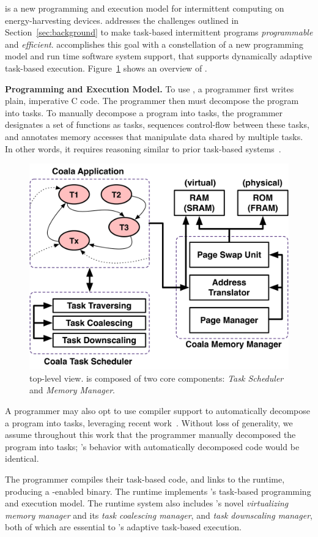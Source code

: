 \sys is a new programming and execution model for intermittent computing on energy-harvesting devices. \sys addresses the challenges outlined in Section~\ref{sec:background} to make task-based intermittent programs {\em programmable} and {\em efficient}. \sys accomplishes this goal with a constellation of a new programming model and run time software system support, that supports dynamically adaptive task-based execution. Figure~\ref{fig:system_overview} shows an overview of \sys.

\textbf{\sys Programming and Execution Model.}  To use \sys, a programmer first writes plain, imperative C code. The programmer then must decompose the program into tasks. To manually decompose a program into tasks, the programmer designates a set of functions as tasks, sequences control-flow between these tasks, and annotates memory accesses that manipulate data shared by multiple tasks. In other words, it requires reasoning similar to prior task-based systems~\cite{chain,alpaca}. 

\begin{figure}
	\centering
	\includegraphics[width=0.5\columnwidth]{figures/graffle/overview.pdf}
	\caption{\sys top-level view. \sys is composed of two core components: \emph{Task Scheduler} and \emph{Memory Manager}.}
	\label{fig:system_overview}
\end{figure}

A programmer may also opt to use compiler support to automatically decompose a program into tasks, leveraging recent work~\cite{cleancut_2018,baghsorkhi_cgo_2018}. Without loss of generality, we assume throughout this work that the programmer manually decomposed the program into tasks; \sys's behavior with automatically decomposed code would be identical.

The programmer compiles their task-based code, and links to the \sys runtime, producing a \sys-enabled binary. The \sys runtime implements \sys's task-based programming and execution model. The runtime system also includes \sys's novel {\em virtualizing memory manager} and its {\em task coalescing manager}, and {\em task downscaling manager}, both of which are essential to \sys's adaptive task-based execution.

